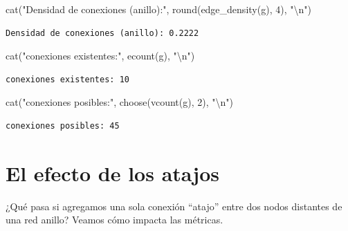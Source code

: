 \documentclass[
  letterpaper,
  DIV=11,
  numbers=noendperiod]{scrreprt}
\newenvironment{Shaded}{\begin{snugshade}}{\end{snugshade}}
\newcommand{\DecValTok}[1]{\textcolor[rgb]{0.68,0.00,0.00}{#1}}
\newcommand{\FunctionTok}[1]{\textcolor[rgb]{0.28,0.35,0.67}{#1}}
\newcommand{\NormalTok}[1]{\textcolor[rgb]{0.00,0.23,0.31}{#1}}
\newcommand{\SpecialCharTok}[1]{\textcolor[rgb]{0.37,0.37,0.37}{#1}}
\newcommand{\StringTok}[1]{\textcolor[rgb]{0.13,0.47,0.30}{#1}}
\begin{document}
\begin{Shaded}
\begin{Highlighting}[]
\FunctionTok{cat}\NormalTok{(}\StringTok{"Densidad de conexiones (anillo):"}\NormalTok{, }\FunctionTok{round}\NormalTok{(}\FunctionTok{edge\_density}\NormalTok{(g), }\DecValTok{4}\NormalTok{), }\StringTok{"}\SpecialCharTok{\textbackslash{}n}\StringTok{"}\NormalTok{)}
\end{Highlighting}
\end{Shaded}

\begin{verbatim}
Densidad de conexiones (anillo): 0.2222 
\end{verbatim}

\begin{Shaded}
\begin{Highlighting}[]
\FunctionTok{cat}\NormalTok{(}\StringTok{"conexiones existentes:"}\NormalTok{, }\FunctionTok{ecount}\NormalTok{(g), }\StringTok{"}\SpecialCharTok{\textbackslash{}n}\StringTok{"}\NormalTok{)}
\end{Highlighting}
\end{Shaded}

\begin{verbatim}
conexiones existentes: 10 
\end{verbatim}

\begin{Shaded}
\begin{Highlighting}[]
\FunctionTok{cat}\NormalTok{(}\StringTok{"conexiones posibles:"}\NormalTok{, }\FunctionTok{choose}\NormalTok{(}\FunctionTok{vcount}\NormalTok{(g), }\DecValTok{2}\NormalTok{), }\StringTok{"}\SpecialCharTok{\textbackslash{}n}\StringTok{"}\NormalTok{)}
\end{Highlighting}
\end{Shaded}

\begin{verbatim}
conexiones posibles: 45 
\end{verbatim}

\section{El efecto de los atajos}\label{el-efecto-de-los-atajos}

¿Qué pasa si agregamos una sola conexión ``atajo'' entre dos nodos
distantes de una red anillo? Veamos cómo impacta las métricas.
\end{document}
